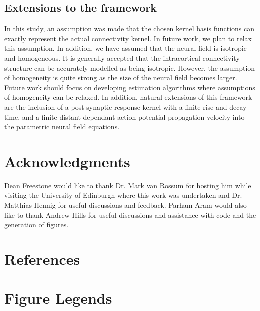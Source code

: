 \documentclass[12pt]{iopart}
\begin{document}
\subsection{Extensions to the framework}

In this study, an assumption was made that the chosen kernel basis functions can exactly represent the actual connectivity kernel. In future work, we plan to relax this assumption. In addition, we have assumed that the neural field is isotropic and homogeneous. It is generally accepted that the intracortical connectivity structure can be accurately modelled as being isotropic. However, the assumption of homogeneity is quite strong as the size of the neural field becomes larger. Future work should focus on developing estimation algorithms where assumptions of homogeneity can be relaxed. In addition, natural extensions of this framework are the inclusion of a post-synaptic response kernel with a finite rise and decay time, and a finite distant-dependant action potential propagation velocity into the parametric neural field equations.

\section{Acknowledgments}
Dean Freestone would like to thank Dr. Mark van Rossum for hosting him while visiting the University of Edinburgh where this work was undertaken and Dr. Matthias Hennig for useful discussions and feedback. Parham Aram would also like to thank Andrew Hills for useful discussions and assistance with code and the generation of figures.


\section*{References}
 


\section*{Figure Legends}
\end{document}
